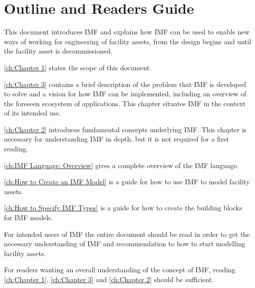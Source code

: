\documentclass[../main.tex]{subfiles}
\begin{document}
\chapter{Outline and Readers Guide}


This document  introduces IMF and explains how IMF can be used to enable new ways of working for
engineering of facility assets, from the design begins and until the facility asset is decommissioned. 


\autoref{ch:Chapter 1} states the scope of this document.

\autoref{ch:Chapter 3} contains a brief description of the problem that IMF is developed to solve and a vision for how IMF can be implemented, including an overview of the
foreseen ecosystem of applications.
This chapter situates IMF in the context of its intended use. 



\autoref{ch:Chapter 2} introduces fundamental concepts underlying IMF. This chapter is necessary for understanding IMF in depth, but it is not required for a first reading. 

\autoref{ch:IMF Language: Overview} gives a complete overview of the IMF language. 

\autoref{ch:How to Create an IMF Model} is a guide for how to use IMF to
model facility assets.

\autoref{ch:How to Specify IMF Types} is a guide for how to create the building blocks for IMF models. 
%

%


For intended users of IMF the entire document should be read in order to get the necessary understanding of IMF and recommendation to how to start
modelling facility assets.

For readers wanting an overall understanding of the concept of IMF, reading \autoref{ch:Chapter 1}, \autoref{ch:Chapter 3} and \autoref{ch:Chapter 2}
should be sufficient. 

\end{document}
